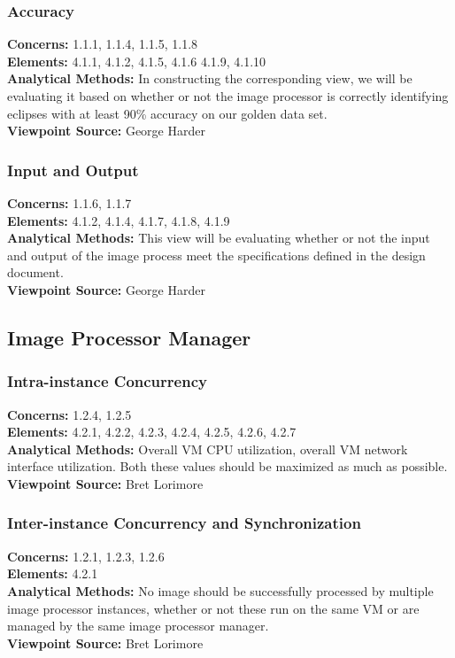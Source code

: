 \documentclass[10pt, onecolumn, draftclsnofoot, letterpaper, compsoc]{IEEEtran}
\begin{document}
\subsubsection{Accuracy}

\textbf{Concerns:} 1.1.1, 1.1.4, 1.1.5, 1.1.8 \\
\textbf{Elements:} 4.1.1, 4.1.2, 4.1.5, 4.1.6 4.1.9, 4.1.10\\
\textbf{Analytical Methods:}  In constructing the corresponding view, we will be
evaluating it based on whether or not the image processor is correctly
identifying eclipses with at least 90\% accuracy on our golden data set.\\
\textbf{Viewpoint Source:} George Harder \\

\subsubsection{Input and Output}

\textbf{Concerns:} 1.1.6, 1.1.7 \\
\textbf{Elements:} 4.1.2, 4.1.4, 4.1.7, 4.1.8, 4.1.9\\
\textbf{Analytical Methods:} This view will be evaluating whether or not the
input and output of the image process meet the specifications defined in the
design document. \\
\textbf{Viewpoint Source:} George Harder\\

\subsection{Image Processor Manager}

    \subsubsection{Intra-instance Concurrency}
    \textbf{Concerns:} 1.2.4, 1.2.5 \\
    \textbf{Elements:} 4.2.1, 4.2.2, 4.2.3, 4.2.4, 4.2.5, 4.2.6, 4.2.7 \\
    \textbf{Analytical Methods:} Overall VM CPU utilization, overall VM network interface utilization.
    Both these values should be maximized as much as possible. \\
    \textbf{Viewpoint Source:} Bret Lorimore \\

    \subsubsection{Inter-instance Concurrency and Synchronization}
    \textbf{Concerns:} 1.2.1, 1.2.3, 1.2.6 \\
    \textbf{Elements:} 4.2.1 \\
    \textbf{Analytical Methods:} No image should be successfully processed by multiple image processor
    instances, whether or not these run on the same VM or are managed by the same image processor manager. \\
    \textbf{Viewpoint Source:} Bret Lorimore \\
\end{document}
